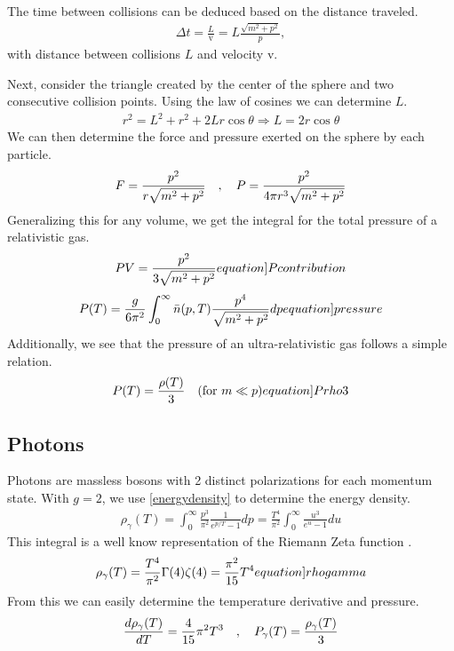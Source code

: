 The time between collisions can be deduced based on the distance traveled. 
\begin{align}
    \Delta t = \frac{L}{\mathrm{v}}=L\frac{\sqrt{m^2+p^2}}{p},
\end{align}
with distance between collisions $L$ and velocity $\mathrm{v}$.

Next, consider the triangle created by the center of the sphere and two consecutive collision points. Using the law of cosines we can determine $L$.
\begin{align}
    r^2=L^2+r^2+2L r \cos \theta \Rightarrow
    L = 2r \cos \theta
\end{align}
We can then determine the force and pressure exerted on the sphere by each particle. 
\begin{align}
    F = \frac{p^2}{r\sqrt{m^2+p^2}} \quad , \quad P = \frac{p^2}{4\pi r^3\sqrt{m^2+p^2}}
\end{align}
Generalizing this for any volume, we get the integral for the total pressure of a relativistic gas.
\begin{align}
    PV=\frac{p^2}{3\sqrt{m^2+p^2}} 
    \label[equation]{Pcontribution}
\end{align}
\begin{align}
    P(T)=\frac{g}{6\pi^2}\int_{0}^{\infty}\bar{n}(p,T)\frac{p^4}{\sqrt{m^2+p^2}}dp
    \label[equation]{pressure}
\end{align}
Additionally, we see that the pressure of an ultra-relativistic gas follows a simple relation.
\begin{align}
    P(T)=\frac{\rho(T)}{3} \quad (\text{for } m\ll p)
    \label[equation]{Prho3}
\end{align}

\subsection{Photons}


Photons are massless bosons with 2 distinct polarizations for each momentum state. With $g=2$, we use \ref{energydensity} to determine the energy density. 
\begin{align}
    \rho_\gamma(T)=\int_{0}^{\infty} \frac{p^3}{\pi^2}\frac{1}{e^{p/T}-1}dp =  \frac{T^4}{\pi^2}\int_{0}^{\infty}\frac{u^3}{e^{u}-1}du
\end{align}
This integral is a well know representation of the Riemann Zeta function \cite[\href{https://dlmf.nist.gov/25.5.E1}{(25.5.1)}]{NIST:DLMF}.
\begin{align}
    \rho_\gamma(T)=\frac{T^4}{\pi^2}\Gamma(4)\zeta(4)=\frac{\pi^2}{15}T^4
    \label[equation]{rhogamma}
\end{align}
From this we can easily determine the temperature derivative and pressure.
\begin{align}
    \frac{d\rho_\gamma(T)}{dT}=\frac{4}{15}\pi^2T^3 \quad , \quad P_\gamma(T)=\frac{\rho_\gamma(T)}{3}
\end{align}




